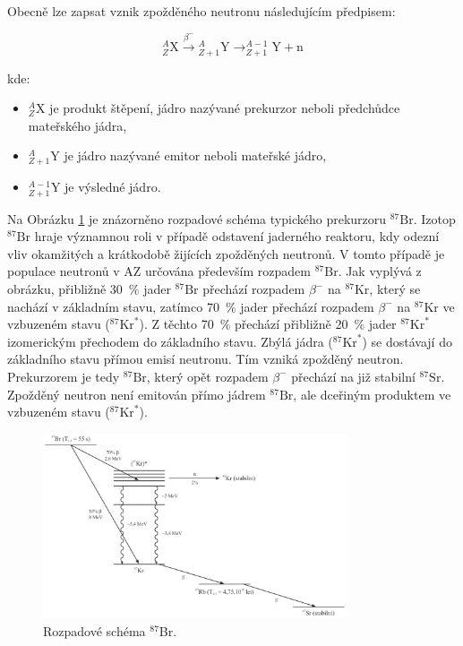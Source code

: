 Obecně lze zapsat vznik zpožděného neutronu následujícím předpisem:

\[
^A_Z\text{X} \xrightarrow{\beta^-} {}^{A}_{Z+1}\text{Y} \rightarrow ^{A-1}_{Z+1}\text{Y} + \text{n}
\]

kde:

\begin{itemize}%
    \item $^A_Z\text{X}$ je produkt štěpení, jádro nazývané prekurzor neboli předchůdce mateřského jádra,
    \item $^{A}_{Z+1}\text{Y}$ je jádro nazývané emitor neboli mateřské jádro,
    \item $^{A-1}_{Z+1}\text{Y}$ je výsledné jádro.
\end{itemize}

Na Obrázku \ref{SNM} je znázorněno rozpadové schéma typického prekurzoru $^{87}\text{Br}$. Izotop $^{87}\text{Br}$ hraje významnou roli v případě odstavení jaderného reaktoru, kdy odezní vliv okamžitých a krátkodobě žijících zpožděných neutronů. V tomto případě je populace neutronů v AZ určována především rozpadem $^{87}\text{Br}$. Jak vyplývá z obrázku, přibližně 30~\% jader $^{87}\text{Br}$ přechází rozpadem $\beta^-$ na $^{87}\text{Kr}$, který se nachází v základním stavu, zatímco 70~\% jader přechází rozpadem $\beta^-$ na $^{87}\text{Kr}$ ve vzbuzeném stavu ($^{87}\text{Kr}^*$). Z těchto 70~\% přechází přibližně 20~\% jader $^{87}\text{Kr}^*$ izomerickým přechodem do základního stavu. Zbýlá jádra ($^{87}\text{Kr}^*$) se dostávají do základního stavu přímou emisí neutronu. Tím vzniká zpožděný neutron. Prekurzorem je tedy $^{87}\text{Br}$, který opět rozpadem $\beta^-$ přechází na již stabilní $^{87}\text{Sr}$. Zpožděný neutron není emitován přímo jádrem $^{87}\text{Br}$, ale dceřiným produktem ve vzbuzeném stavu ($^{87}\text{Kr}^*$).

\begin{figure}[H] 
    \centering
    \includegraphics[width=0.8\textwidth]{img/ZpožděnéNeutrony.png}
    \caption{Rozpadové schéma $^{87}$Br.}
    \label{SNM}
\end{figure}

